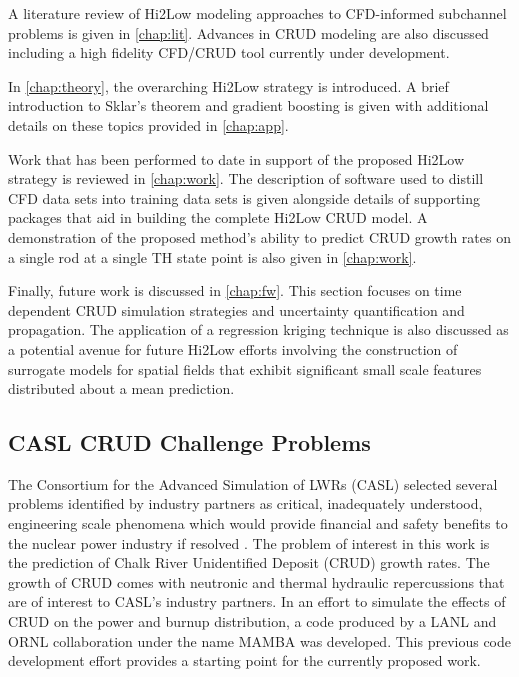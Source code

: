 A literature review of Hi2Low modeling approaches to CFD-informed subchannel
problems is given in \autoref{chap:lit}.  Advances in CRUD modeling are
also discussed including a high fidelity
CFD/CRUD tool currently under development.  

In \autoref{chap:theory}, the overarching Hi2Low strategy is introduced.  A
brief introduction to Sklar's theorem and gradient boosting is given with
additional details on these topics provided in \autoref{chap:app}.

Work that has been performed to date in support of the proposed Hi2Low strategy is reviewed in
\autoref{chap:work}.  The description of software used to distill CFD data sets into
training data sets is given alongside details of supporting packages that aid in building
the complete Hi2Low CRUD model.
A demonstration of the proposed method's ability to predict CRUD growth
rates on a single rod at a single TH state point is also given in
\autoref{chap:work}.

Finally, future work is discussed in \autoref{chap:fw}.  This section
focuses on time dependent CRUD simulation strategies and uncertainty
quantification and propagation.  The application of a regression kriging
technique is also discussed as a potential avenue for future Hi2Low efforts
involving the construction of surrogate models for spatial fields that exhibit
significant small scale features distributed about a mean prediction.

\subsection{CASL CRUD Challenge Problems}

The Consortium for the Advanced Simulation of LWRs (CASL) selected several problems identified by industry partners as critical, inadequately understood, engineering scale phenomena which would provide
financial and safety benefits to the nuclear power industry if resolved \cite{Turinsky15}.
The problem of
interest in this work is the prediction of Chalk River Unidentified Deposit
(CRUD) growth rates.  The growth of CRUD comes with neutronic and thermal
hydraulic repercussions that are of interest to CASL's industry partners.
In an effort to simulate the
effects of CRUD on the power and burnup distribution, a code produced by a LANL
and ORNL collaboration \cite{collins16} under the name MAMBA was developed.
This previous code development effort provides a starting point for the currently proposed work.

